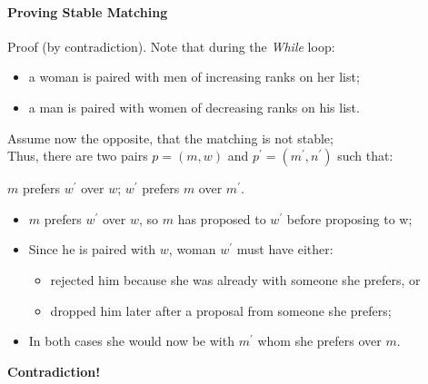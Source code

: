 \paragraph{Proving Stable Matching} Proof (by contradiction).
Note that during the \textit{While} loop:
\begin{itemize}
    \item a woman is paired with men of increasing ranks on her list;
    \item a man is paired with women of decreasing ranks on his list.
\end{itemize}
Assume now the opposite, that the matching is not stable;\\
Thus, there are two pairs $p=(m,w)$ and $p^\prime=(m^\prime,n^\prime)$ such that:
\begin{center}
    $m$ prefers $w^\prime$ over $w$; \hspace{50pt} 
    $w^\prime$ prefers $m$ over $m^\prime$.
\end{center}
\begin{itemize}
    \item $m$ prefers $w^\prime$ over $w$, so $m$ has proposed to $w^\prime$ before
    proposing to w;
    \item Since he is paired with $w$, woman $w^\prime$ must have either:
    \begin{itemize}
        \item rejected him because she was already with someone she prefers, or
        \item dropped him later after a proposal from someone she prefers;
    \end{itemize}
    \item In both cases she would now be with $m^\prime$ whom she prefers over $m$.
\end{itemize}
\textbf{Contradiction!}

